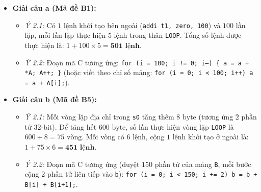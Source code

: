 \begin{itemize}
    \item \textbf{Giải câu a (Mã đề B1):}
    \begin{itemize}
        \item \textit{Ý 2.1:} Có $1$ lệnh khởi tạo bên ngoài (\texttt{addi t1, zero, 100}) và $100$ lần lặp, mỗi lần lặp thực hiện $5$ lệnh trong thân \texttt{LOOP}. Tổng số lệnh được thực hiện là: $1 + 100 \times 5 = \mathbf{501\text{ lệnh}}$.
        \item \textit{Ý 2.2:} Đoạn mã C tương ứng: \texttt{for (i = 100; i != 0; i--) \{ a = a + *A; A++; \}} (hoặc viết theo chỉ số mảng: \texttt{for (i = 0; i < 100; i++) a = a + A[i];}).
    \end{itemize}
    \item \textbf{Giải câu b (Mã đề B5):}
    \begin{itemize}
        \item \textit{Ý 2.1:} Mỗi vòng lặp địa chỉ trong \texttt{s0} tăng thêm $8\text{ byte}$ (tương ứng $2$ phần tử 32-bit). Để tăng hết $600\text{ byte}$, số lần thực hiện vòng lặp \texttt{LOOP} là $600 \div 8 = 75\text{ vòng}$. Mỗi vòng có $6$ lệnh, cộng $1$ lệnh khởi tạo ở ngoài là: $1 + 75 \times 6 = \mathbf{451\text{ lệnh}}$.
        \item \textit{Ý 2.2:} Đoạn mã C tương ứng (duyệt $150$ phần tử của mảng \texttt{B}, mỗi bước cộng 2 phần tử liên tiếp vào \texttt{b}): \texttt{for (i = 0; i < 150; i += 2) b = b + B[i] + B[i+1];}.
    \end{itemize}
\end{itemize}

